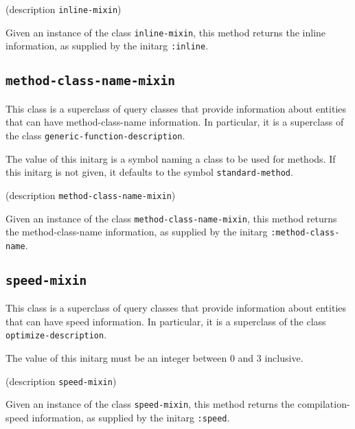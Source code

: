 {\footnotesize
{} {(description {\tt inline-mixin})}
}

Given an instance of the class \texttt{inline-mixin}, this method
returns the inline information, as supplied by the initarg
\texttt{:inline}.

\subsection{\texttt{method-class-name-mixin}}
\label{sec-method-class-name-mixin}

{\footnotesize
{}
}

This class is a superclass of query classes that provide information
about entities that can have method-class-name information.  In
particular, it is a superclass of the class
\texttt{generic-function-description}.

{\footnotesize
{}
}

The value of this initarg is a symbol naming a class to be used for
methods.  If this initarg is not given, it defaults to the symbol
\texttt{standard-method}.

{\footnotesize
{} {(description {\tt method-class-name-mixin})}
}

Given an instance of the class \texttt{method-class-name-mixin}, this
method returns the method-class-name information, as supplied by the
initarg \texttt{:method-class-name}.

\subsection{\texttt{speed-mixin}}
\label{sec-speed-mixin}

{\footnotesize
{}
}

This class is a superclass of query classes that provide information
about entities that can have speed information.  In particular, it is a
superclass of the class \texttt{optimize-description}.

{\footnotesize
{}
}

The value of this initarg must be an integer between $0$ and $3$
inclusive.

{\footnotesize
{} {(description {\tt speed-mixin})}
}

Given an instance of the class \texttt{speed-mixin}, this method
returns the compilation-speed information, as supplied by the initarg
\texttt{:speed}.

